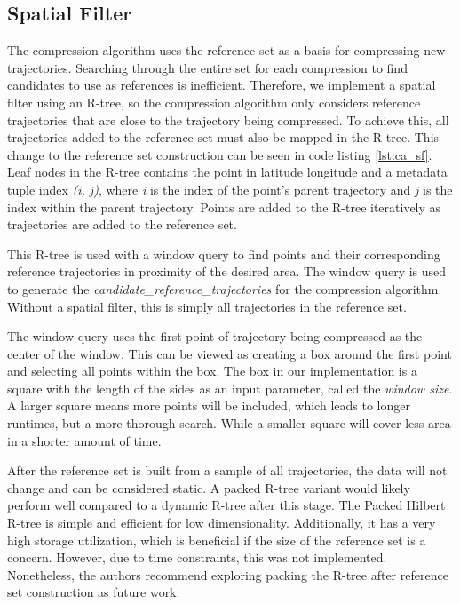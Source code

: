 \subsection{Spatial Filter}
\label{sec:sf}
The compression algorithm uses the reference set as a basis for compressing new trajectories. Searching through the entire set for each compression to find candidates to use as references is inefficient. Therefore, we implement a spatial filter using an R-tree, so the compression algorithm only considers reference trajectories that are close to the trajectory being compressed. To achieve this, all trajectories added to the reference set must also be mapped in the R-tree. This change to the reference set construction can be seen in code listing \ref{lst:ca_sf}. Leaf nodes in the R-tree contains the point in latitude longitude and a metadata tuple index \textit{(i, j)}, where \textit{i} is the index of the point's parent trajectory and \textit{j} is the index within the parent trajectory. Points are added to the R-tree iteratively as trajectories are added to the reference set.

This R-tree is used with a window query to find points and their corresponding reference trajectories in proximity of the desired area. The window query is used to generate the \textit{candidate\_reference\_trajectories} for the compression algorithm. Without a spatial filter, this is simply all trajectories in the reference set.

The window query uses the first point of trajectory being compressed as the center of the window. This can be viewed as creating a box around the first point and selecting all points within the box. The box in our implementation is a square with the length of the sides as an input parameter, called the \textit{window size}. A larger square means more points will be included, which leads to longer runtimes, but a more thorough search. While a smaller square will cover less area in a shorter amount of time.

After the reference set is built from a sample of all trajectories, the data will not change and can be considered static. A packed R-tree variant would likely perform well compared to a dynamic R-tree after this stage. The Packed Hilbert R-tree is simple and efficient for low dimensionality. Additionally, it has a very high storage utilization, which is beneficial if the size of the reference set is a concern. However, due to time constraints, this was not implemented. Nonetheless, the authors recommend exploring packing the R-tree after reference set construction as future work.

